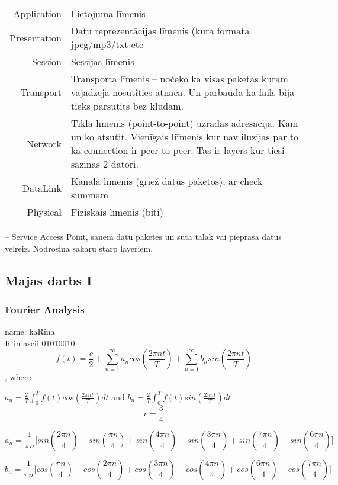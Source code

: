 \begin{center}
  \begin{tabular}{ r | l }
  \hline
  Application & Lietojuma līmenis\\
  Presentation& Datu reprezentācijas līmenis (kura formata jpeg/mp3/txt etc\\
  Session     & Sessijas līmenis   \\
  Transport   & Transporta līmenis -- nočeko ka visas paketas 
  kuram vajadzeja nosutities atnaca. Un parbauda ka fails bija tieks parsutits bez kludam.\\
  Network     & Tīkla līmenis (point-to-point) uzradas adresācija.
  Kam un ko atsutit. Vienīgais liīmenis kur nav iluzijas par to 
  ka connection ir peer-to-peer. Tas ir layers kur tiesi sazinas
   2 datori. \\
  DataLink    & Kanala līmenis (griež datus paketos), ar check summam\\
  Physical    & Fiziskais līmenis (biti) \\
  \end{tabular}
\end{center}

 -- Service Access Point, sanem datu paketes un suta talak vai pieprasa datus velreiz.
Nodrosina sakaru starp layeriem.

\subsection{Majas darbs I}
\subsubsection{Fourier Analysis}
name: kaRina \\
R in ascii 01010010\\

$$f(t) = \frac{c}{2} + 
    \sum_{n=1}^{\infty}a_n cos(\frac{2 \pi n t}{T}) + 
    \sum_{n=1}^{\infty}b_n sin(\frac{2 \pi n t}{T})$$,
    where

$a_n=\frac{2}{T} \int_0^T f(t) cos (\frac{2 \pi n t}{T})dt $ and
$b_n=\frac{2}{T} \int_0^T f(t) sin (\frac{2 \pi n t}{T})dt $
$$c = \frac{3}{4}$$

$$a_n = \frac{1}{\pi n } \bigg[ 
  sin(\frac{2 \pi n}{4}) -
  sin(\frac{\pi n}{4})   +
  sin(\frac{4 \pi n}{4}) -
  sin(\frac{3 \pi n}{4}) +
  sin(\frac{7 \pi n}{4}) -
  sin(\frac{6 \pi n}{4})
 \bigg]
 $$

 $$b_n = \frac{1}{\pi n } \bigg[ 
  cos(\frac{\pi n}{4}) -
  cos(\frac{2 \pi n}{4})   +
  cos(\frac{3 \pi n}{4}) -
  cos(\frac{4 \pi n}{4}) +
  cos(\frac{6 \pi n}{4}) -
  cos(\frac{7 \pi n}{4})
 \bigg]
 $$

